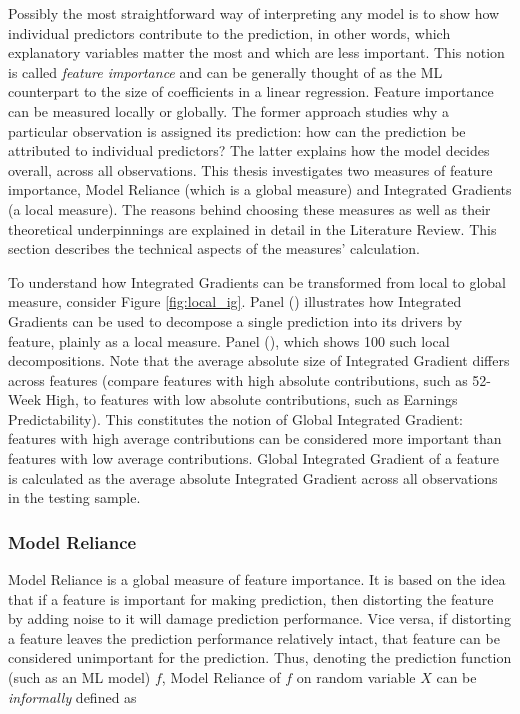 		Possibly the most straightforward way of interpreting any model is to show how individual predictors contribute to the prediction, in other words, which explanatory variables matter the most and which are less important. This notion is called \textit{feature importance} and can be generally thought of as the ML counterpart to the size of coefficients in a linear regression. Feature importance can be measured locally or globally. The former approach studies why a particular observation is assigned its prediction: how can the prediction be attributed to individual predictors? The latter explains how the model decides overall, across all observations. This thesis investigates two measures of feature importance, Model Reliance \citep{fisher2019all} (which is a global measure) and Integrated Gradients \citep{sundararajan2017axiomatic} (a local measure). The reasons behind choosing these measures as well as their theoretical underpinnings are explained in detail in the Literature Review. This section describes the technical aspects of the measures' calculation.
		
		To understand how Integrated Gradients can be transformed from local to global measure, consider Figure \ref{fig:local_ig}. Panel () illustrates how Integrated Gradients can be used to decompose a single prediction into its drivers by feature, plainly as a local measure. Panel (), which shows 100 such local decompositions. Note that the average absolute size of Integrated Gradient differs across features (compare features with high absolute contributions, such as 52-Week High, to features with low absolute contributions, such as Earnings Predictability). This constitutes the notion of Global Integrated Gradient: features with high average contributions can be considered more important than features with low average contributions. Global Integrated Gradient of a feature is calculated as the average absolute Integrated Gradient across all observations in the testing sample. 
		
		
		\subsubsection{Model Reliance}
			Model Reliance \citep{fisher2019all} is a global measure of feature importance. It is based on the idea that if a feature is important for making prediction, then distorting the feature by adding noise to it will damage prediction performance. Vice versa, if distorting a feature leaves the prediction performance relatively intact, that feature can be considered unimportant for the prediction. Thus, denoting  the prediction function (such as an ML model) $f$, Model Reliance of  $f$ on random variable $X$ can be \textit{informally} defined as
			
